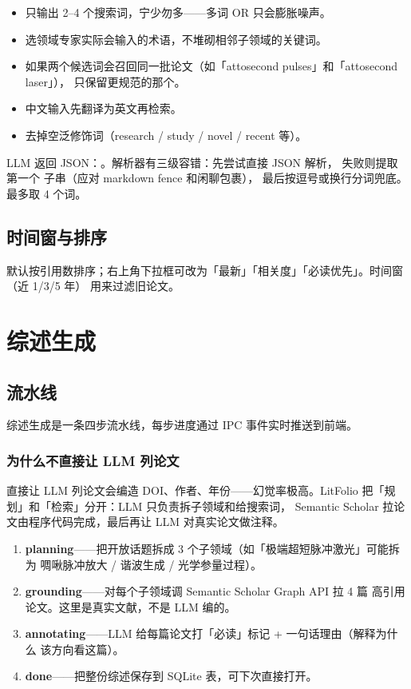 \begin{itemize}
  \item 只输出 2--4 个搜索词，宁少勿多——多词 OR 只会膨胀噪声。
  \item 选领域专家实际会输入的术语，不堆砌相邻子领域的关键词。
  \item 如果两个候选词会召回同一批论文（如「attosecond pulses」和「attosecond laser」），
    只保留更规范的那个。
  \item 中文输入先翻译为英文再检索。
  \item 去掉空泛修饰词（research / study / novel / recent 等）。
\end{itemize}

LLM 返回 JSON：。解析器有三级容错：先尝试直接 JSON 解析，
失败则提取第一个  子串（应对 markdown fence 和闲聊包裹），
最后按逗号或换行分词兜底。最多取 4 个词。

\subsection{时间窗与排序}

默认按引用数排序；右上角下拉框可改为「最新」「相关度」「必读优先」。时间窗（近 1/3/5 年）
用来过滤旧论文。

\section{综述生成}


\subsection{流水线}

综述生成是一条四步流水线，每步进度通过 IPC 事件实时推送到前端。

\subsubsection{为什么不直接让 LLM 列论文}

直接让 LLM 列论文会编造 DOI、作者、年份——幻觉率极高。LitFolio
把「规划」和「检索」分开：LLM 只负责拆子领域和给搜索词，
Semantic Scholar 拉论文由程序代码完成，最后再让 LLM 对真实论文做注释。

\begin{enumerate}
  \item \textbf{planning}——把开放话题拆成 3 个子领域（如「极端超短脉冲激光」可能拆为
    啁啾脉冲放大 / 谐波生成 / 光学参量过程）。
  \item \textbf{grounding}——对每个子领域调 Semantic Scholar Graph API 拉 4 篇
    高引用论文。这里是真实文献，不是 LLM 编的。
  \item \textbf{annotating}——LLM 给每篇论文打「必读」标记 + 一句话理由（解释为什么
    该方向看这篇）。
  \item \textbf{done}——把整份综述保存到 SQLite  表，可下次直接打开。
\end{enumerate}

